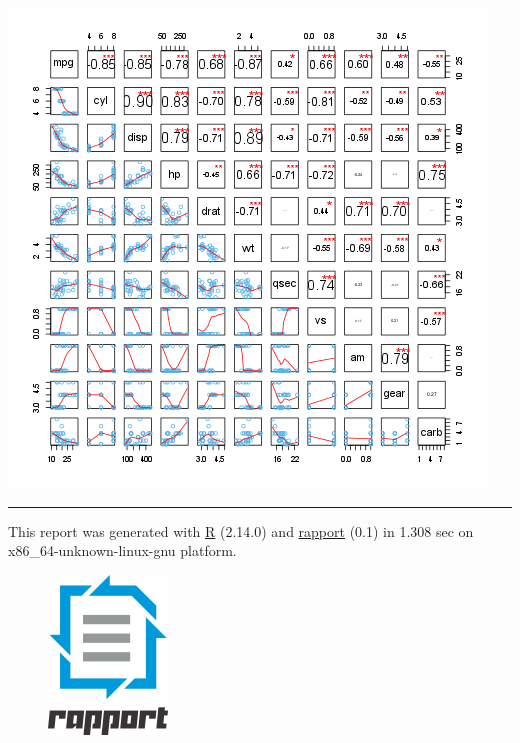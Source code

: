 \documentclass[]{article}
\makeatletter
\def\maxwidth{\ifdim\Gin@nat@width>\linewidth\linewidth
\else\Gin@nat@width\fi}
\let\Oldincludegraphics\includegraphics
\renewcommand{\includegraphics}[1]{\Oldincludegraphics[width=\maxwidth]{#1}}
\makeatother
\begin{document}
\href{/tmp/RtmpeIwHkw/file30916d08-hires.png}{\includegraphics{82a0f381195bb4f50da3c943e264add1.png}}

\begin{center}\rule{3in}{0.4pt}\end{center}

This report was generated with \href{http://www.r-project.org/}{R}
(2.14.0) and \href{http://al3xa.github.com/rapport/}{rapport} (0.1) in
1.308 sec on x86\_64-unknown-linux-gnu platform.

\begin{figure}[htbp]
\centering
\includegraphics{images/logo.png}
\caption{}
\end{figure}
\end{document}
